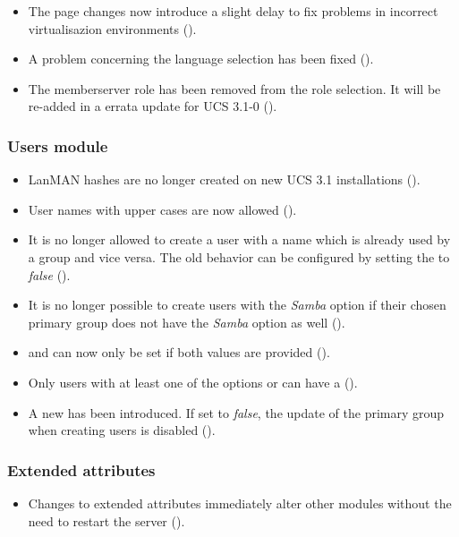 \begin{itemize}
\item The page changes now introduce a slight delay to fix problems in
  incorrect virtualisazion environments ().

\item A problem concerning the language selection has been fixed
  ().

\item The memberserver role has been removed from the role selection. It
will be re-added in a errata update for UCS 3.1-0 ().

\end{itemize}

\subsubsection{Users module}
\begin{itemize}
\item LanMAN hashes are no longer created on new UCS 3.1 installations
  ().

\item User names with upper cases are now allowed ().

\item It is no longer allowed to create a user with a name which is
  already used by a group and vice versa. The old behavior can be
  configured by setting the
   to \emph{false}
  ().
\item It is no longer possible to create users with the \emph{Samba}
  option if their chosen primary group does not have the \emph{Samba}
  option as well ().
\item {} and  can now only be
  set if both values are provided ().

\item Only users with at least one of the options  or
   can have a  ().

\item A new  has
been introduced. If set to \emph{false}, the update of the primary group when
creating users is disabled ().

\end{itemize}


\subsubsection{Extended attributes}
\begin{itemize}
\item Changes to extended attributes immediately alter other modules without
  the need to restart the \ucsUMC{} server ().
\end{itemize}


